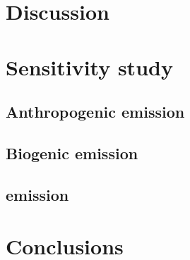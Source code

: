 \section{Discussion}\label{sec:2006/discussion}

\section{Sensitivity study}\label{sec:2006/sens}
\subsection{Anthropogenic emission}\label{ssec:2006/sens/anthrop}
\subsection{Biogenic emission}\label{ssec:2006/sens/bio}
\subsection{{\lnox} emission}\label{ssec:2006/sens/lnox}

\section{Conclusions}\label{sec:2006/conslusion}